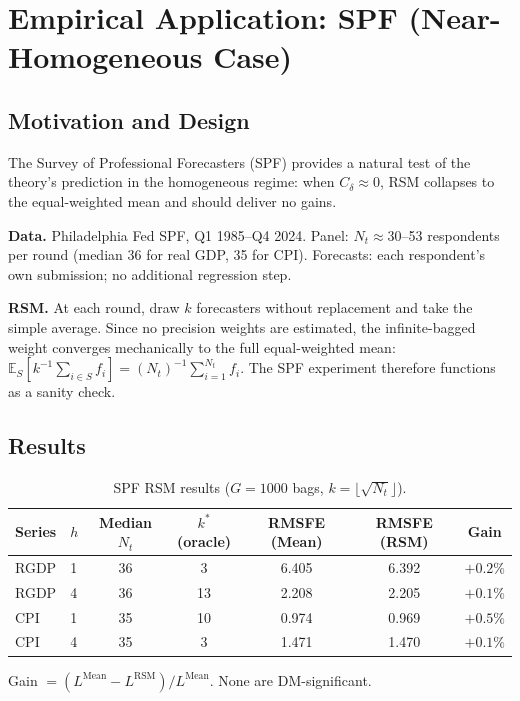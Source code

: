 \documentclass[12pt,a4paper]{article}
\theoremstyle{definition}
\newcommand{\E}{\mathbb{E}}
\begin{document}
\section{Empirical Application: SPF (Near-Homogeneous Case)}
\label{sec:spf}

\subsection{Motivation and Design}

The Survey of Professional Forecasters (SPF) provides a natural test of the
theory's prediction in the homogeneous regime: when $C_\delta\approx 0$,
RSM collapses to the equal-weighted mean and should deliver no gains.

\textbf{Data.} Philadelphia Fed SPF, Q1 1985--Q4 2024.  Panel:
$N_t\approx 30$--53 respondents per round (median 36 for real GDP, 35 for
CPI).  Forecasts: each respondent's own submission; no additional regression
step.

\textbf{RSM.} At each round, draw $k$ forecasters without replacement and
take the simple average.  Since no precision weights are estimated, the
infinite-bagged weight converges mechanically to the full equal-weighted mean:
$\E_S[k^{-1}\sum_{i\in S}f_i]=(N_t)^{-1}\sum_{i=1}^{N_t}f_i$.  The SPF
experiment therefore functions as a sanity check.

\subsection{Results}

\begin{table}[ht]
\centering
\caption{SPF RSM results ($G=1000$ bags, $k=\lfloor\sqrt{N_t}\rfloor$).}
\label{tab:spf}
\begin{tabular}{llccccc}
\toprule
Series & $h$ & Median $N_t$ & $k^*$(oracle) & RMSFE (Mean) & RMSFE (RSM) & Gain \\
\midrule
RGDP & 1 & 36 & 3  & 6.405 & 6.392 & $+0.2\%$ \\
RGDP & 4 & 36 & 13 & 2.208 & 2.205 & $+0.1\%$ \\
CPI  & 1 & 35 & 10 & 0.974 & 0.969 & $+0.5\%$ \\
CPI  & 4 & 35 & 3  & 1.471 & 1.470 & $+0.1\%$ \\
\bottomrule
\end{tabular}
\footnotesize{Gain $=(L^{\mathrm{Mean}}-L^{\mathrm{RSM}})/L^{\mathrm{Mean}}$.
None are DM-significant.}
\end{table}
\end{document}
